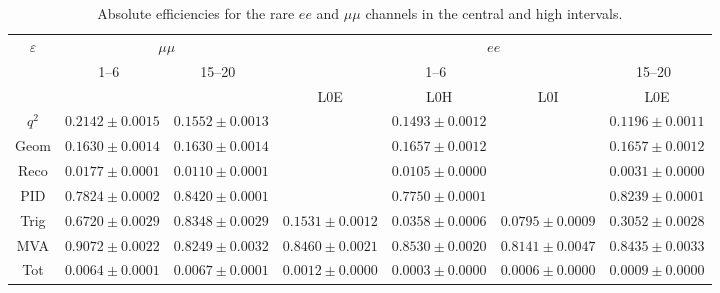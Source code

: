 \begin{landscape}

\begin{table}
\centering
\caption{Absolute efficiencies for the rare $ee$ and $\mu\mu$ channels in the central and high \qsq intervals.}
\begin{tabular}{|c|c|c|c|c|c|c|}
\hline \multirow{3}{*}{$\varepsilon$} 			&  \multicolumn {2}{c|}{$\mu\mu$} 				& \multicolumn {4}{c|}{$ee$} \\ \cline{2-7}
			 & 1--6~\gevgevcccc				& 15--20~\gevgevcccc  				& \multicolumn {3}{c|}{1--6~\gevgevcccc} 				& \multicolumn {1}{c|}{15--20~\gevgevcccc }\\ \cline{2-7}
				&  \multicolumn {2}{c|}{} &  L0E 	& L0H 	& L0I 	& L0E 	\\ \hline
$q^2$  & $ 0.2142  \pm  0.0015 $ & $ 0.1552  \pm  0.0013 $ &  \multicolumn{3}{c|}{$ 0.1493  \pm  0.0012 $} & \multicolumn{1}{c|}{$ 0.1196  \pm  0.0011 $} \\
Geom  & $ 0.1630  \pm  0.0014 $ & $ 0.1630  \pm  0.0014 $ &  \multicolumn{3}{c|}{$ 0.1657  \pm  0.0012 $} & \multicolumn{1}{c|}{$ 0.1657  \pm  0.0012 $} \\
Reco  & $ 0.0177  \pm  0.0001 $ & $ 0.0110  \pm  0.0001 $ &  \multicolumn{3}{c|}{$ 0.0105  \pm  0.0000 $} & \multicolumn{1}{c|}{$ 0.0031  \pm  0.0000 $} \\
PID  & $ 0.7824  \pm  0.0002 $ & $ 0.8420  \pm  0.0001 $ &  \multicolumn{3}{c|}{$ 0.7750  \pm  0.0001 $} & \multicolumn{1}{c|}{$ 0.8239  \pm  0.0001 $} \\
\hline
Trig  & $ 0.6720  \pm  0.0029 $ & $ 0.8348  \pm  0.0029 $ & $ 0.1531  \pm  0.0012 $ & $ 0.0358  \pm  0.0006 $ & $ 0.0795  \pm  0.0009 $ & $ 0.3052  \pm  0.0028 $  \\
MVA  & $ 0.9072  \pm  0.0022 $ & $ 0.8249  \pm  0.0032 $ & $ 0.8460  \pm  0.0021 $ & $ 0.8530  \pm  0.0020 $ & $ 0.8141  \pm  0.0047 $ & $ 0.8435  \pm  0.0033 $  \\
\hline
Tot  & $ 0.0064  \pm  0.0001 $ & $ 0.0067  \pm  0.0001 $ & $ 0.0012  \pm  0.0000 $ & $ 0.0003  \pm  0.0000 $ & $ 0.0006  \pm  0.0000 $ & $ 0.0009  \pm  0.0000 $  \\
\hline
\end{tabular}
\label{tab:RKst_AbsEff}
\end{table}



\end{landscape}
